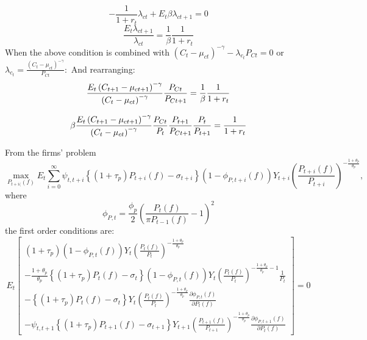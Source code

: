\documentclass{article}
\begin{document}
\[
-\frac{1}{1+r_{t}}\lambda _{ct}+E_{t}\beta \lambda _{ct+1}=0 
\]%
\[
\frac{E_{t}\lambda _{ct+1}}{\lambda _{ct}}=\frac{1}{\beta }\frac{1}{1+r_{t}} 
\]%
When the above condition is combined with $\left( C_{t}-\mu _{ct}\right)
^{-\gamma }-\lambda _{c_{t}}P_{Ct}=0$ or $\lambda _{c_{t}}=\frac{\left(
C_{t}-\mu _{ct}\right) ^{-\gamma }}{P_{Ct}}:$ And rearranging: 
\[
\frac{E_{t}\left( C_{t+1}-\mu _{ct+1}\right) ^{-\gamma }}{\left( C_{t}-\mu
_{ct}\right) ^{-\gamma }}\frac{P_{Ct}}{P_{Ct+1}}=\frac{1}{\beta }\frac{1}{%
1+r_{t}} 
\]

\[
\beta \frac{E_{t}\left( C_{t+1}-\mu _{ct+1}\right) ^{-\gamma }}{\left(
C_{t}-\mu _{ct}\right) ^{-\gamma }}\frac{P_{Ct}}{P_{t}}\frac{P_{t+1}}{%
P_{Ct+1}}\frac{P_{t}}{P_{t+1}}=\frac{1}{1+r_{t}} 
\]

From the firms' problem%
\[
\max_{P_{t+i(}(f)}E_{t}\sum_{i=0}^{\infty }\psi _{t,t+i}\left\{ \left(
1+\tau _{p}\right) P_{t+i}\left( f\right) -\sigma _{t+i}\right\} \left(
1-\phi _{P,t+i}\left( f\right) \right) Y_{t+i}\left( \frac{P_{t+i}\left(
f\right) }{P_{t+i}}\right) ^{-\frac{1+\theta _{p}}{\theta _{p}}}, 
\]%
where%
\[
\phi _{P,t}=\frac{\phi _{p}}{2}\left( \frac{P_{t}\left( f\right) }{\pi
P_{t-1}\left( f\right) }-1\right) ^{2} 
\]%
the first order conditions are:%
\[
E_{t}\left[ 
\begin{array}{c}
\left( 1+\tau _{p}\right) \left( 1-\phi _{P,t}\left( f\right) \right)
Y_{t}\left( \frac{P_{t}\left( f\right) }{P_{t}}\right) ^{-\frac{1+\theta _{p}%
}{\theta _{p}}} \\ 
-\frac{1+\theta _{p}}{\theta _{p}}\left\{ \left( 1+\tau _{p}\right)
P_{t}\left( f\right) -\sigma _{t}\right\} \left( 1-\phi _{P,t}\left(
f\right) \right) Y_{t}\left( \frac{P_{t}\left( f\right) }{P_{t}}\right) ^{-%
\frac{1+\theta _{p}}{\theta _{p}}-1}\frac{1}{P_{t}} \\ 
-\left\{ \left( 1+\tau _{p}\right) P_{t}\left( f\right) -\sigma _{t}\right\}
Y_{t}\left( \frac{P_{t}\left( f\right) }{P_{t}}\right) ^{-\frac{1+\theta _{p}%
}{\theta _{p}}}\frac{\partial \phi _{P,t}\left( f\right) }{\partial
P_{t}\left( f\right) } \\ 
-\psi _{t,t+1}\left\{ \left( 1+\tau _{p}\right) P_{t+1}\left( f\right)
-\sigma _{t+1}\right\} Y_{t+1}\left( \frac{P_{t+1}\left( f\right) }{P_{t+1}}%
\right) ^{-\frac{1+\theta _{p}}{\theta _{p}}}\frac{\partial \phi
_{P,t+1}\left( f\right) }{\partial P_{t}\left( f\right) }%
\end{array}%
\right] =0 
\]%
\end{document}
